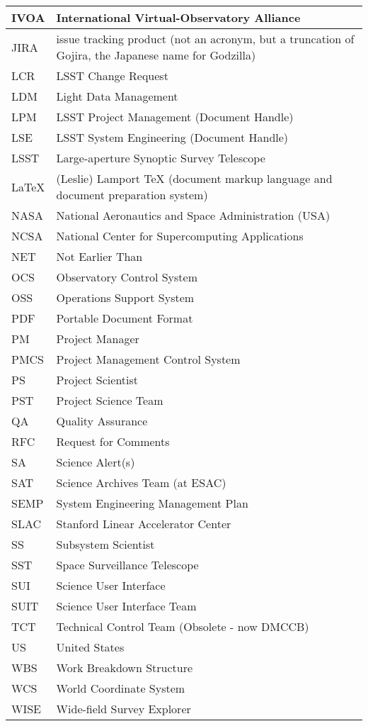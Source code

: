 \begin{longtable}{|l|p{}|}
IVOA&International Virtual-Observatory Alliance \\\hline
JIRA&issue tracking product (not an acronym, but a truncation of Gojira, the Japanese name for Godzilla) \\\hline
LCR&LSST Change Request \\\hline
LDM&Light Data Management \\\hline
LPM&LSST Project Management (Document Handle) \\\hline
LSE&LSST System Engineering (Document Handle) \\\hline
LSST&Large-aperture Synoptic Survey Telescope \\\hline
LaTeX&(Leslie) Lamport TeX (document markup language and document preparation system) \\\hline
NASA&National Aeronautics and Space Administration (USA) \\\hline
NCSA&National Center for Supercomputing Applications \\\hline
NET&Not Earlier Than \\\hline
OCS&Observatory Control System \\\hline
OSS&Operations Support System \\\hline
PDF&Portable Document Format \\\hline
PM&Project Manager \\\hline
PMCS&Project Management Control System \\\hline
PS&Project Scientist \\\hline
PST&Project Science Team \\\hline
QA&Quality Assurance \\\hline
RFC&Request for Comments \\\hline
SA&Science Alert(s) \\\hline
SAT&Science Archives Team (at ESAC) \\\hline
SEMP&System Engineering Management Plan \\\hline
SLAC&Stanford Linear Accelerator Center \\\hline
SS&Subsystem Scientist \\\hline
SST&Space Surveillance Telescope \\\hline
SUI&Science User Interface \\\hline
SUIT&Science User Interface Team \\\hline
TCT&Technical Control Team (Obsolete - now DMCCB) \\\hline
US&United States \\\hline
WBS&Work Breakdown Structure \\\hline
WCS&World Coordinate System \\\hline
WISE&Wide-field Survey Explorer \\\hline
\end{longtable} 
